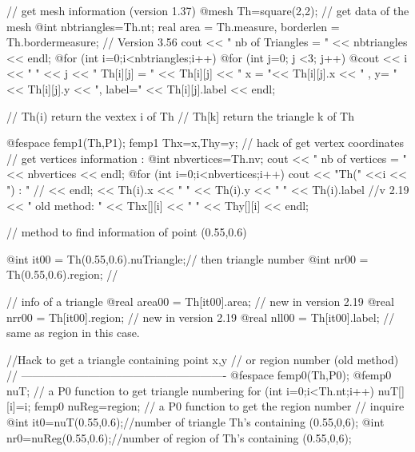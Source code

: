 \documentclass[a4paper,twoside,12pt]{book}
\begin{document}
\bFF
{ // get mesh information (version 1.37)
  @mesh Th=square(2,2);
  // get data of the mesh
  @int nbtriangles=Th.nt;
  real area = Th.measure, borderlen = Th.bordermeasure; // Version 3.56
  cout << " nb of Triangles = " << nbtriangles << endl;
  @for (int i=0;i<nbtriangles;i++)
    @for (int j=0; j <3; j++)
      @cout << i << " " << j << " Th[i][j] = "
           << Th[i][j] << "  x = "<< Th[i][j].x  << " , y= "<< Th[i][j].y
           << ",  label=" << Th[i][j].label << endl;

//    Th(i)   return   the vextex i of Th\hfilll
//   Th[k]   return   the triangle k of Th\hfilll

  @fespace femp1(Th,P1);
  femp1 Thx=x,Thy=y; //  hack of get vertex coordinates
  // get vertices information :
  @int nbvertices=Th.nv;
  cout << " nb of vertices = " << nbvertices << endl;
  @for (int i=0;i<nbvertices;i++)
        cout << "Th(" <<i  << ") : "   // << endl;
             << Th(i).x << " " << Th(i).y  << " " << Th(i).label //v 2.19
             << "       old method: " << Thx[][i] << " " << Thy[][i] << endl;

// method to find information of point (0.55,0.6)

  @int it00 = Th(0.55,0.6).nuTriangle;// then triangle number
  @int nr00 = Th(0.55,0.6).region; // 

//  info of a triangle
  @real area00 = Th[it00].area; // new in version 2.19  
  @real nrr00 = Th[it00].region; // new in version 2.19   
  @real nll00 = Th[it00].label; // same as region in this case.  


//Hack  to get a triangle containing point x,y\hfilll
//     or   region number (old method) \hfilll
// ------------------------------------------------------- \hfilll
  @fespace femp0(Th,P0);
  @femp0 nuT; // a P0 function  to get triangle numbering
    for (int i=0;i<Th.nt;i++)
     nuT[][i]=i;
  femp0 nuReg=region; // a P0 function to get the region number
  //  inquire
  @int it0=nuT(0.55,0.6);//number of triangle Th's containing (0.55,0,6);
  @int nr0=nuReg(0.55,0.6);//number of region of Th's containing (0.55,0,6);


}
\end{document}
